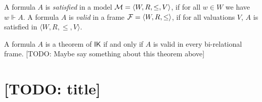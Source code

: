 \documentclass[twoside]{aiml18}
\newcommand{\todo}[1]{{\color{red}[TODO: #1]}}
\newcommand*{\IK}{\mathsf{IK}}
\newcommand{\SEQ}{\Rightarrow}
\begin{document}



\begin{definition}
	A formula $A$ is \emph{satisfied} in a model $\mathcal{M} = \langle W, R, \le, V \rangle$, if for all $w \in W$ we have $w \Vdash A$.
%
	A formula $A$ is \emph{valid} in a frame $\mathcal{F} = \langle W, R, \le \rangle$, if for all valuations $V$, $A$ is satisfied in $\langle W, R, \le, V \rangle$.
\end{definition}

%

\begin{theorem}
	A formula $A$ is a theorem of $\IK$ if and only if $A$ is valid in every bi-relational frame.
	\todo{Maybe say something about this theorem above}
\end{theorem}

\section{\todo{title}}
\end{document}
